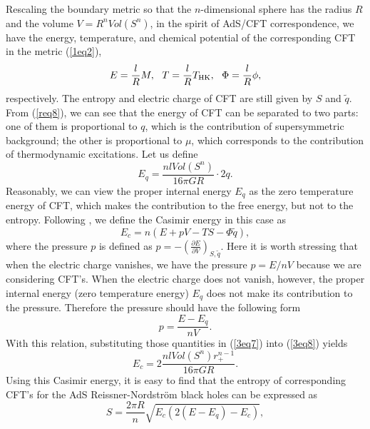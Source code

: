 \documentclass[a4paper,12pt]{article}
\begin{document}
Rescaling the boundary metric so that  the $n$-dimensional sphere has the 
radius $R$ and the volume $V=R^nVol(S^n)$, in the spirit of AdS/CFT 
correspondence, we have the energy,
temperature, and chemical potential of the corresponding CFT in the metric
(\ref{1eq2}), 
\begin{eqnarray}
\label{3eq7}
E = \frac{l}{R} M, \ \  T=\frac{l}{R}T_{\rm HK}, \ \ \Phi=\frac{l}{R}\phi,
\end{eqnarray}
respectively. The entropy and electric charge of CFT are still given by $S$
and $\tilde q$. From (\ref{req8}), we can see that the energy of CFT can 
be separated to two parts: one of them is proportional to $q$, which is the
contribution of supersymmetric background; the other is proportional to 
$\mu$, which corresponds to the contribution of thermodynamic excitations. 
Let us define
\begin{equation}
\label{req12}
E_q =\frac{nl Vol(S^n)}{16\pi GR}\cdot 2q.
\end{equation}
Reasonably, we can view the proper internal energy $E_q$ as the zero 
temperature energy of CFT, which makes the contribution to the free energy,
but not to the entropy.  Following \cite{Verl}, we define the Casimir energy 
in this case as
\begin{equation}
\label{3eq8}
E_c= n(E+pV -TS -\Phi \tilde q),
\end{equation}  
where the pressure $p$ is defined as $p=-\left(\frac{\partial E}{\partial V}
\right)_{S,\tilde q}$. Here it is worth stressing that when the electric charge
vanishes, we have the pressure $p= E/nV$ because  we are considering CFT's.
When the electric charge does not vanish, however,  the proper internal
energy (zero temperature energy) $E_q$ does not make its contribution to the
pressure. Therefore the pressure should have the following form
\begin{equation}
\label{req14}
p = \frac{E-E_q}{n V}.
\end{equation}
With this relation, substituting those quantities in (\ref{3eq7}) into 
(\ref{3eq8}) yields
\begin{equation}
\label{3eq9}
E_c=2\frac{nl Vol(S^n)r_+^{n-1}}{16\pi GR}.
\end{equation}
Using this Casimir energy, it is easy to find that the entropy of corresponding
CFT's for the AdS Reissner-Nordstr\"om black holes can be expressed as
\begin{equation}
\label{3eq11}
S=\frac{2\pi R}{n}\sqrt{E_c(2(E-E_q)-E_c)},
\end{equation}
\end{document}

